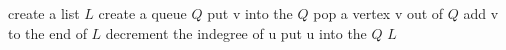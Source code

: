 \begin{algorithm}[H]
    \begin{algorithmic}[1]
    \small
    \State create a list $L$
    \State create a queue $Q$
    \State put v into the $Q$
    \EndIf
    \EndFor
    \State pop a vertex v out of $Q$
    \State add v to the end of $L$
    \State decrement the indegree of u
    \State put u into the $Q$
    \EndIf
    \EndFor
    \EndWhile
    \State \Return $L$
    \EndProcedure
    \end{algorithmic}
\end{algorithm}